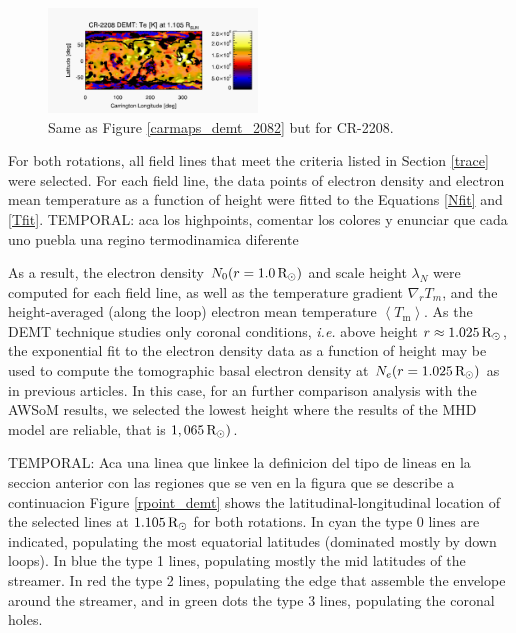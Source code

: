 \documentclass[namedreferences]{solarphysics}
\newcommand{\mrsun}{{\rm R_\odot}}
\newcommand{\lN}{\lambda_N}
\newcommand{\aTm}{\left< T_\textrm{m}\right>}
\def\temp#1{\textcolor{mygray}{TEMPORAL: #1}}
\begin{document}
\begin{article}
\begin{figure}[h!]
\begin{center}
\includegraphics[width=0.495\textwidth]{figs/map_Tm_CR2208_DEMT-AIA_H1_L522_r3d_1105_Rsun.pdf}
\caption{Same as Figure \ref{carmaps_demt_2082} but for CR-2208.}
\label{carmaps_demt_2208}
\end{center}
\end{figure}



For both rotations, all field lines that meet the criteria listed in Section \ref{trace} were selected. For each field line, the data points of electron density and electron mean temperature as a function of height were fitted to the Equations \ref{Nfit} and \ref{Tfit}.
\temp{aca los highpoints, comentar los colores y enunciar que cada uno puebla una regino termodinamica diferente}


 As a result, the electron density $N_0(r=1.0\,\mrsun)$ and scale height $\lN$ were computed for each field line, as well as the temperature gradient $\nabla_r T_m$, and the height-averaged (along the loop) electron mean temperature $\aTm$. As the DEMT technique studies only coronal conditions, \textit{i.e.} above height $r\approx 1.025\,\mrsun$, the exponential fit to the electron density data as a function of height may be used to compute the tomographic basal electron density at $ N_e(r=1.025\,\mrsun)$ as in previous articles. In this case, for an further comparison analysis with the AWSoM results, we selected the lowest height where the results of the MHD model are reliable, that is $1,065\,\mrsun)$.

\temp{Aca una linea que linkee la definicion del tipo de lineas en la seccion anterior con las regiones que se ven en la figura que se describe a continuacion}
Figure \ref{rpoint_demt} shows the latitudinal-longitudinal location of the selected lines at $1.105\,\mrsun$ for both rotations. In cyan the type 0 lines are indicated, populating the most equatorial latitudes (dominated mostly by down loops). In blue the type 1 lines, populating mostly the mid latitudes of the streamer. In red the type 2 lines, populating the edge that assemble the envelope around the streamer, and in green dots the type 3 lines, populating the coronal holes.


\end{article}
\end{document}
